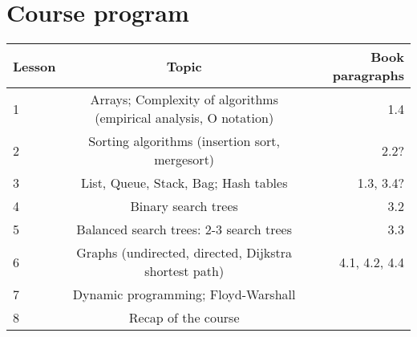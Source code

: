 \section{Course program}
	
	\begin{tabular}{ | l | c | r | }
		\hline
	  	Lesson & Topic & Book paragraphs \\
	  	\hline
  		1 & Arrays; Complexity of algorithms (empirical analysis, O notation) & 1.4 \\
  		\hline
  		2 & Sorting algorithms (insertion sort, mergesort) & 2.2? \\
  		\hline
  		3 & List, Queue, Stack, Bag; Hash tables & 1.3, 3.4? \\
  		\hline
  		4 & Binary search trees & 3.2 \\
  		\hline
  		5 & Balanced search trees: 2-3 search trees & 3.3 \\
  		\hline
  		6 & Graphs (undirected, directed, Dijkstra shortest path) & 4.1, 4.2, 4.4 \\
  		\hline
  		7 & Dynamic programming; Floyd-Warshall & \\
  		\hline
  		8 & Recap of the course & \\
  		\hline
	\end{tabular}